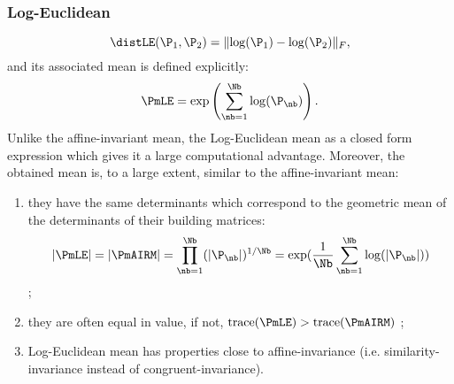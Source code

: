 \subsubsection{Log-Euclidean}
\iflatexml\else {} \fi
\begin{equation}
\distLE(\P_1, \P_2) = \lVert \log(\P_1)-\log(\P_2) \rVert_F ,
\label{eq:dist_LE}
\end{equation}
and its associated mean is defined explicitly:
\begin{equation}
\PmLE = \exp \left(\sum_{\nb=1}^{\Nb} \log(\P_\nb) \right) .
\label{eq:mean_LE}
\end{equation}
Unlike the affine-invariant mean, the Log-Euclidean mean as a closed form expression which gives it a large computational advantage. 
Moreover, the obtained mean is, to a large extent, similar to the affine-invariant mean:
\begin{enumerate}[label=(\roman*)]
\item they have the same determinants which correspond to the geometric mean of the determinants of their building matrices: \[ |\PmLE| = |\PmAIRM| = \prod_{\nb=1}^{\Nb} (|\P_\nb|)^{1/\Nb} = \exp(\frac{1}{\Nb}\sum_{\nb=1}^{\Nb}\log(|\P_\nb|)) \] ;
\item they are often equal in value, if not, $\mathrm{trace}(\PmLE) > \mathrm{trace}(\PmAIRM)$ ;
\item Log-Euclidean mean has properties close to affine-invariance (i.e. similarity-invariance instead of congruent-invariance).
\end{enumerate}

